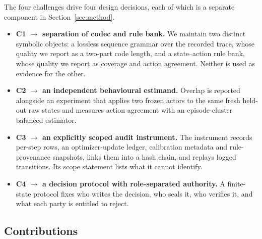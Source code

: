 \documentclass[11pt,a4paper]{article}
\begin{document}
The four challenges drive four design decisions, each of which is a separate component in Section~\ref{sec:method}.
\begin{itemize}
  \item \textbf{C1 $\rightarrow$ separation of codec and rule bank.} We maintain two distinct symbolic objects: a lossless sequence grammar over the recorded trace, whose quality we report as a two-part code length, and a state--action rule bank, whose quality we report as coverage and action agreement. Neither is used as evidence for the other.
  \item \textbf{C2 $\rightarrow$ an independent behavioural estimand.} Overlap is reported alongside an experiment that applies two frozen actors to the same fresh held-out raw states and measures action agreement with an episode-cluster balanced estimator.
  \item \textbf{C3 $\rightarrow$ an explicitly scoped audit instrument.} The instrument records per-step rows, an optimizer-update ledger, calibration metadata and rule-provenance snapshots, links them into a hash chain, and replays logged transitions. Its scope statement lists what it cannot identify.
  \item \textbf{C4 $\rightarrow$ a decision protocol with role-separated authority.} A finite-state protocol fixes who writes the decision, who seals it, who verifies it, and what each party is entitled to reject.
\end{itemize}

\subsection{Contributions}
\label{sec:intro-contrib}
\end{document}
